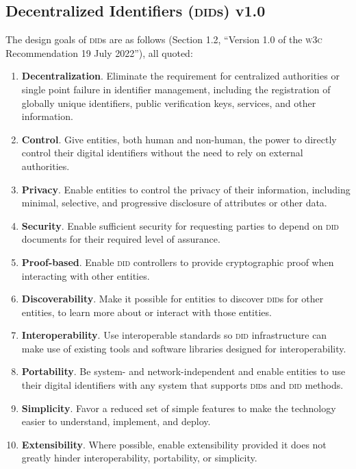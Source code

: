 \documentclass[twoside]{article}
\begin{document}
\subsection{Decentralized Identifiers (\textsc{did}s) v1.0}

The design goals of \textsc{did}s are as follows (Section 1.2, ``Version 1.0 of the \textsc{w3c} Recommendation 19 July 2022''), all quoted:

\begin{enumerate}
  \item  \sloppy \textbf{Decentralization}. Eliminate the requirement for centralized authorities or single point failure in identifier management, including the registration of globally unique identifiers, public verification keys, services, and other information.
  \item  \textbf{Control}. Give entities, both human and non-human, the power to directly control their digital identifiers without the need to rely on external authorities.
  \item  \textbf{Privacy}. Enable entities to control the privacy of their information, including minimal, selective, and progressive disclosure of attributes or other data.
  \item  \textbf{Security}. Enable sufficient security for requesting parties to depend on \textsc{did} documents for their required level of assurance.
  \item  \textbf{Proof-based}. Enable \textsc{did} controllers to provide cryptographic proof when interacting with other entities.
  \item  \textbf{Discoverability}. Make it possible for entities to discover \textsc{did}s for other entities, to learn more about or interact with those entities.
  \item  \textbf{Interoperability}. Use interoperable standards so \textsc{did} infrastructure can make use of existing tools and software libraries designed for interoperability.
  \item  \textbf{Portability}. Be system- and network-independent and enable entities to use their digital identifiers with any system that supports \textsc{did}s and \textsc{did} methods.
  \item  \textbf{Simplicity}. Favor a reduced set of simple features to make the technology easier to understand, implement, and deploy.
  \item  \textbf{Extensibility}. Where possible, enable extensibility provided it does not greatly hinder interoperability, portability, or simplicity.
\end{enumerate}

\printbibliography
\end{document}
